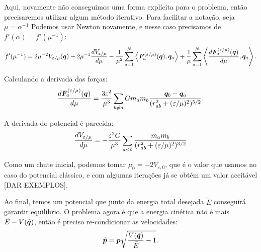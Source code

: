 Aqui, novamente não conseguimos uma forma explícita para o problema, então precisaremos utilizar algum método iterativo. Para facilitar a notação, seja $\mu = \alpha^{-1}$ Podemos usar Newton novamente, e nesse caso precisamos de $f'(\alpha) = f'(\mu^{-1})$:
\begin{equation}
    f'(\mu^{-1}) = 
    2 \mu^{-2} V_{\varepsilon/\mu} (\bm q)
    - 2 \mu^{-1} \dfrac{d V_{\varepsilon/\mu}}{d \mu}
    - \dfrac{1}{\mu^2} \sum_{a=1}^N \left\langle \bm F_a^{(\varepsilon/\mu)}(\bm q), \bm q_a \right\rangle + \dfrac{1}{\mu} \sum_{a=1}^N \left\langle \dfrac{d \bm F_a^{(\varepsilon/\mu)}(\bm q)}{d \mu}, \bm q_a \right\rangle.
\end{equation}

Calculando a derivada das forças:
\begin{equation}
    \dfrac{d \bm F_a^{(\varepsilon/\mu)}(\bm q)}{d \mu}
    = \dfrac{3 \varepsilon^2}{\mu^3} \sum_{b \neq a} G m_a m_b \dfrac{\bm q_b - \bm q_a}{(r_{ab}^2 + (\varepsilon/\mu)^2)^{5/2}}.
\end{equation}

A derivada do potencial é parecida:
\begin{equation}
    \dfrac{d V_{\varepsilon/\mu}}{d \mu} = - \dfrac{\varepsilon^2 G}{\mu^3} \sum_{a < b} \dfrac{m_a m_b}{(r_{ab}^2 + (\varepsilon/\mu)^2)^{3/2}}
\end{equation}

Como um chute inicial, podemos tomar $\mu_0 = - 2 V_{\varepsilon, 0}$, que é o valor que usamos no caso do potencial clássico, e com algumas iterações já se obtém um valor aceitável [DAR EXEMPLOS].

Ao final, temos um potencial que junto da energia total desejada $\tilde E$ conseguirá garantir equilíbrio. O problema agora é que a energia cinética não é mais $\tilde E - V(\tilde{\bm q})$, então é preciso re-condicionar as velocidades:
\begin{equation}
    \tilde{\bm p} = \bm p \sqrt{\dfrac{V(\tilde{\bm q})}{\tilde E} - 1}.
\end{equation}